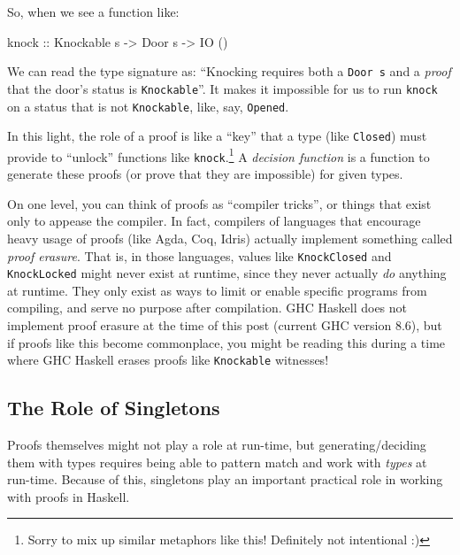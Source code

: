 \documentclass[]{article}
\newenvironment{Shaded}{}{}
\newcommand{\DataTypeTok}[1]{\textcolor[rgb]{0.56,0.13,0.00}{#1}}
\newcommand{\NormalTok}[1]{#1}
\newcommand{\OtherTok}[1]{\textcolor[rgb]{0.00,0.44,0.13}{#1}}
\begin{document}
So, when we see a function like:

\begin{Shaded}
\begin{Highlighting}[]
\OtherTok{knock ::} \DataTypeTok{Knockable}\NormalTok{ s }\OtherTok{->} \DataTypeTok{Door}\NormalTok{ s }\OtherTok{->} \DataTypeTok{IO}\NormalTok{ ()}
\end{Highlighting}
\end{Shaded}

We can read the type signature as: ``Knocking requires both a \texttt{Door\ s}
and a \emph{proof} that the door's status is \texttt{Knockable}''. It makes it
impossible for us to run \texttt{knock} on a status that is not
\texttt{Knockable}, like, say, \texttt{\textquotesingle{}Opened}.

In this light, the role of a proof is like a ``key'' that a type (like
\texttt{\textquotesingle{}Closed}) must provide to ``unlock'' functions like
\texttt{knock}.\footnote{Sorry to mix up similar metaphors like this! Definitely
  not intentional :)} A \emph{decision function} is a function to generate these
proofs (or prove that they are impossible) for given types.

On one level, you can think of proofs as ``compiler tricks'', or things that
exist only to appease the compiler. In fact, compilers of languages that
encourage heavy usage of proofs (like Agda, Coq, Idris) actually implement
something called \emph{proof erasure}. That is, in those languages, values like
\texttt{KnockClosed} and \texttt{KnockLocked} might never exist at runtime,
since they never actually \emph{do} anything at runtime. They only exist as ways
to limit or enable specific programs from compiling, and serve no purpose after
compilation. GHC Haskell does not implement proof erasure at the time of this
post (current GHC version 8.6), but if proofs like this become commonplace, you
might be reading this during a time where GHC Haskell erases proofs like
\texttt{Knockable} witnesses!

\hypertarget{the-role-of-singletons}{%
\subsection{The Role of Singletons}\label{the-role-of-singletons}}

Proofs themselves might not play a role at run-time, but generating/deciding
them with types requires being able to pattern match and work with \emph{types}
at run-time. Because of this, singletons play an important practical role in
working with proofs in Haskell.
\end{document}
